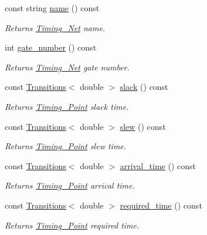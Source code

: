\begin{DoxyCompactItemize}
\item 
const string \hyperlink{classTiming__Analysis_1_1Timing__Point_aa4e767553f03fb8dea972d4443edc615}{name} () const 
\begin{DoxyCompactList}\small\item\em Returns \hyperlink{classTiming__Analysis_1_1Timing__Net}{Timing\-\_\-\-Net} name. \end{DoxyCompactList}\item 
int \hyperlink{classTiming__Analysis_1_1Timing__Point_a9f8c6bbc7bc46a3d1ff81a984e76126f}{gate\-\_\-number} () const 
\begin{DoxyCompactList}\small\item\em Returns \hyperlink{classTiming__Analysis_1_1Timing__Net}{Timing\-\_\-\-Net} gate number. \end{DoxyCompactList}\item 
const \hyperlink{classTransitions}{Transitions}$<$ double $>$ \hyperlink{classTiming__Analysis_1_1Timing__Point_af5a20a073bd09092700ceed49a74e3e7}{slack} () const 
\begin{DoxyCompactList}\small\item\em Returns \hyperlink{classTiming__Analysis_1_1Timing__Point}{Timing\-\_\-\-Point} slack time. \end{DoxyCompactList}\item 
const \hyperlink{classTransitions}{Transitions}$<$ double $>$ \hyperlink{classTiming__Analysis_1_1Timing__Point_ae4d46c6ca5f00b75088e2edb5a3bac21}{slew} () const 
\begin{DoxyCompactList}\small\item\em Returns \hyperlink{classTiming__Analysis_1_1Timing__Point}{Timing\-\_\-\-Point} slew time. \end{DoxyCompactList}\item 
const \hyperlink{classTransitions}{Transitions}$<$ double $>$ \hyperlink{classTiming__Analysis_1_1Timing__Point_ad5a21b6fae7de267768c6f108a96cc4b}{arrival\-\_\-time} () const 
\begin{DoxyCompactList}\small\item\em Returns \hyperlink{classTiming__Analysis_1_1Timing__Point}{Timing\-\_\-\-Point} arrical time. \end{DoxyCompactList}\item 
const \hyperlink{classTransitions}{Transitions}$<$ double $>$ \hyperlink{classTiming__Analysis_1_1Timing__Point_aab60710f64cbc89f7316515aaca8ea17}{required\-\_\-time} () const 
\begin{DoxyCompactList}\small\item\em Returns \hyperlink{classTiming__Analysis_1_1Timing__Point}{Timing\-\_\-\-Point} required time. \end{DoxyCompactList}\item 

\end{DoxyCompactItemize}
